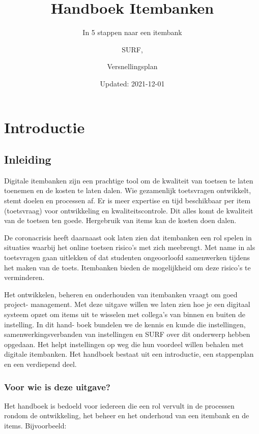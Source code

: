 \documentclass[
]{book}
\title{Handboek Itembanken}
\subtitle{In 5 stappen naar een itembank}
\author{SURF, \and Versnellingsplan}
\date{Updated: 2021-12-01}
\begin{document}
\maketitle

{
\setcounter{tocdepth}{1}
\tableofcontents
}
\hypertarget{introductie}{%
\chapter{Introductie}\label{introductie}}

\hypertarget{inleiding}{%
\section{Inleiding}\label{inleiding}}

Digitale itembanken zijn een prachtige tool om de kwaliteit van toetsen te laten toenemen en de kosten te laten dalen. Wie gezamenlijk toetsvragen ontwikkelt, stemt doelen en processen af. Er is meer expertise en tijd beschikbaar per item (toetsvraag) voor ontwikkeling en kwaliteitscontrole. Dit alles komt de kwaliteit van de toetsen ten goede. Hergebruik van items kan de kosten doen dalen.

De coronacrisis heeft daarnaast ook laten zien dat itembanken een rol spelen in situaties waarbij het online toetsen risico's met zich meebrengt. Met name in als toetsvragen gaan uitlekken of dat studenten ongeoorloofd samenwerken tijdens het maken van de toets. Itembanken bieden de mogelijkheid om deze risico's te verminderen.

Het ontwikkelen, beheren en onderhouden van itembanken vraagt om goed project- management. Met deze uitgave willen we laten zien hoe je een digitaal systeem opzet om items uit te wisselen met collega's van binnen en buiten de instelling. In dit hand- boek bundelen we de kennis en kunde die instellingen, samenwerkingsverbanden van instellingen en SURF over dit onderwerp hebben opgedaan. Het helpt instellingen op weg die hun voordeel willen behalen met digitale itembanken. Het handboek bestaat uit een introductie, een stappenplan en een verdiepend deel.

\hypertarget{voor-wie-is-deze-uitgave}{%
\subsection{Voor wie is deze uitgave?}\label{voor-wie-is-deze-uitgave}}

Het handboek is bedoeld voor iedereen die een rol vervult in de processen rondom de ontwikkeling, het beheer en het onderhoud van een itembank en de items. Bijvoorbeeld:
\end{document}
